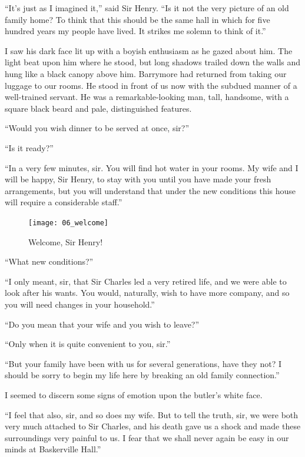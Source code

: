 \documentclass[paper=5.5in:8.5in,BCOR=7mm,twoside,DIV=calc,12pt,usegeometry,openany,chapterprefix,endperiod,headings=big]{scrbook} %
\begin{document}
\enquote{It's just as I imagined it,} said Sir Henry. \enquote{Is it not the very picture of an old family home? To think that this should be the same hall in which for five hundred years my people have lived. It strikes me solemn to think of it.}

I saw his dark face lit up with a boyish enthusiasm as he gazed about him. The light beat upon him where he stood, but long shadows trailed down the walls and hung like a black canopy above him. Barrymore had returned from taking our luggage to our rooms. He stood in front of us now with the subdued manner of a well-trained servant. He was a remarkable-looking man, tall, handsome, with a square black beard and pale, distinguished features.

\enquote{Would you wish dinner to be served at once, sir?}

\enquote{Is it ready?}

\enquote{In a very few minutes, sir. You will find hot water in your rooms. My wife and I will be happy, Sir Henry, to stay with you until you have made your fresh arrangements, but you will understand that under the new conditions this house will require a considerable staff.}

\begin{figure}[h!]
\centering
\texttt{[image: 06\_welcome]}
\caption{Welcome, Sir Henry!}
\end{figure}

\enquote{What new conditions?}

\enquote{I only meant, sir, that Sir Charles led a very retired life, and we were able to look after his wants. You would, naturally, wish to have more company, and so you will need changes in your household.}

\enquote{Do you mean that your wife and you wish to leave?}

\enquote{Only when it is quite convenient to you, sir.}

\enquote{But your family have been with us for several generations, have they not? I should be sorry to begin my life here by breaking an old family connection.}

I seemed to discern some signs of emotion upon the butler's white face.

\enquote{I feel that also, sir, and so does my wife. But to tell the truth, sir, we were both very much attached to Sir Charles, and his death gave us a shock and made these surroundings very painful to us. I fear that we shall never again be easy in our minds at Baskerville Hall.}
\end{document}
